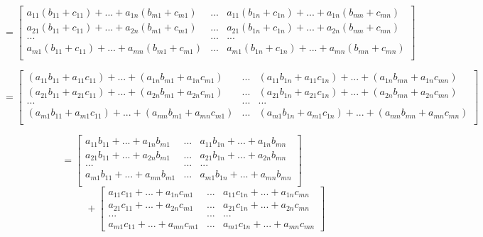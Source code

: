 \documentclass{article}
\begin{document}
\begin{enumerate}
		$$= \begin{bmatrix}
		a_{11}(b_{11} + c_{11}) + ... + a_{1n}(b_{m1} + c_{m1}) & ... & a_{11}(b_{1n} + c_{1n}) + ... + a_{1n}(b_{mn} + c_{mn}) \\
		a_{21}(b_{11} + c_{11}) + ... + a_{2n}(b_{m1} + c_{m1}) & ... & a_{21}(b_{1n} + c_{1n}) + ... + a_{2n}(b_{mn} + c_{mn}) \\
		... & ... & ... \\
		a_{m1}(b_{11} + c_{11}) + ... + a_{mn}(b_{m1} + c_{m1}) & ... & a_{m1}(b_{1n} + c_{1n}) + ... + a_{mn}(b_{mn} + c_{mn}) \\
		\end{bmatrix}$$
		
		$$= \begin{bmatrix}
		(a_{11}b_{11} + a_{11}c_{11}) + ... + (a_{1n}b_{m1} + a_{1n}c_{m1}) & ... & (a_{11}b_{1n} + a_{11}c_{1n}) + ... + (a_{1n}b_{mn} + a_{1n}c_{mn}) \\
		(a_{21}b_{11} + a_{21}c_{11}) + ... + (a_{2n}b_{m1} + a_{2n}c_{m1}) & ... & (a_{21}b_{1n} + a_{21}c_{1n}) + ... + (a_{2n}b_{mn} + a_{2n}c_{mn}) \\
		... & ... & ... \\
		(a_{m1}b_{11} + a_{m1}c_{11}) + ... + (a_{mn}b_{m1} + a_{mn}c_{m1}) & ... & (a_{m1}b_{1n} + a_{m1}c_{1n}) + ... + (a_{mn}b_{mn} + a_{mn}c_{mn}) \\
		\end{bmatrix}$$
		
		$$= \begin{bmatrix}
		a_{11}b_{11} + ... + a_{1n}b_{m1} & ... & a_{11}b_{1n} + ... + a_{1n}b_{mn} \\
		a_{21}b_{11} + ... + a_{2n}b_{m1} & ... & a_{21}b_{1n} + ... + a_{2n}b_{mn} \\
		... & ... & ... \\
		a_{m1}b_{11} + ... + a_{mn}b_{m1} & ... & a_{m1}b_{1n} + ... + a_{mn}b_{mn} \\
		\end{bmatrix}$$ $$ \hspace{2cm} + \begin{bmatrix}
		a_{11}c_{11} + ... + a_{1n}c_{m1} & ... & a_{11}c_{1n} + ... + a_{1n}c_{mn} \\
		a_{21}c_{11} + ... + a_{2n}c_{m1} & ... & a_{21}c_{1n} + ... + a_{2n}c_{mn} \\
		... & ... & ... \\
		a_{m1}c_{11} + ... + a_{mn}c_{m1} & ... & a_{m1}c_{1n} + ... + a_{mn}c_{mn}
		\end{bmatrix}$$
		

\end{enumerate}
\end{document}
